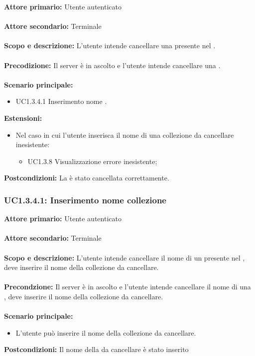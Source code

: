 \documentclass{scalatekids-article}
\begin{document}
\textbf{Attore primario:} Utente autenticato\\ \\
\textbf{Attore secondario:} Terminale\\ \\
\textbf{Scopo e descrizione:} L’utente intende cancellare una  presente nel .\\ \\
\textbf{Precodizione:} Il server è in ascolto e l’utente intende cancellare una .\\ \\
\textbf{Scenario principale:}
\begin{itemize}
  \item UC1.3.4.1 Inserimento nome .
\end{itemize}
\textbf{Estensioni:}
\begin{itemize}
  \item Nel caso in cui l'utente inserisca il nome di una collezione da cancellare inesistente:
  \begin{itemize}
    \item UC1.3.8 Visualizzazione errore  inesistente;
  \end{itemize}
\end{itemize}
\textbf{Postcondizioni:} La  è stato cancellata correttamente.

\subsubsection{UC1.3.4.1: Inserimento nome collezione}

\textbf{Attore primario:} Utente autenticato\\ \\
\textbf{Attore secondario:} Terminale\\ \\
\textbf{Scopo e descrizione:} L'utente intende cancellare il nome di un  presente nel , deve inserire il nome della collezione da cancellare.\\ \\
\textbf{Precondzione:} Il server è in ascolto e l'utente intende cancellare il nome di una , deve inserire il nome della collezione da cancellare.\\ \\
\textbf{Scenario principale:}
\begin{itemize}
  \item L'utente può inserire il nome della collezione da cancellare.
\end{itemize}
\textbf{Postcondizioni:} Il nome della  da cancellare è stato inserito
\end{document}
